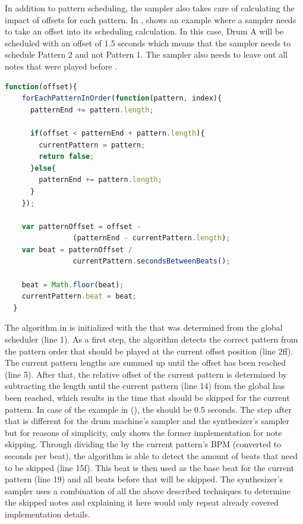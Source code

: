 In addition to pattern scheduling, the sampler also takes care of calculating the impact of offsets for each pattern. In ,  shows an example where a sampler needs to take an offset into its scheduling calculation. In this case, Drum A will be scheduled with an offset of 1.5 seconds which means that the sampler needs to schedule Pattern 2 and not Pattern 1. The sampler also needs to leave out all notes that were played before .

\begin{lstlisting}[language=JavaScript, caption=Calculating offsets (sampler), label=lst:scheduling-offsets]
  function(offset){
    forEachPatternInOrder(function(pattern, index){
      patternEnd += pattern.length;

      if(offset < patternEnd + pattern.length){
        currentPattern = pattern;
        return false;
      }else{
        patternEnd += pattern.length;
      }
    });

    var patternOffset = offset -
                (patternEnd - currentPattern.length);
    var beat = patternOffset /
                currentPattern.secondsBetweenBeats();

    beat = Math.floor(beat);
    currentPattern.beat = beat;
  }
\end{lstlisting}

The algorithm in  is initialized with the  that was determined from the global scheduler (line 1). As a first step, the algorithm detects the correct pattern from the pattern order that should be played at the current offset position (line 2ff). The current pattern lengths are summed up until the offset has been reached (line 5). After that, the relative offset of the current pattern is determined by subtracting the length until the current pattern (line 14) from the global  has been reached, which results in the time that should be skipped for the current pattern. In case of the example in  (), the  should be 0.5 seconds. The step after that is different for the drum machine's sampler and the synthesizer's sampler but for reasons of simplicity,  only shows the former implementation for note skipping. Through dividing the  by the current pattern's BPM (converted to seconds per beat), the algorithm is able to detect the amount of beats that need to be skipped (line 15f). This beat is then used as the base beat for the current pattern (line 19) and all beats before that will be skipped. The synthesizer's sampler uses a combination of all the above described techniques to determine the skipped notes and explaining it here would only repeat already covered implementation details.

